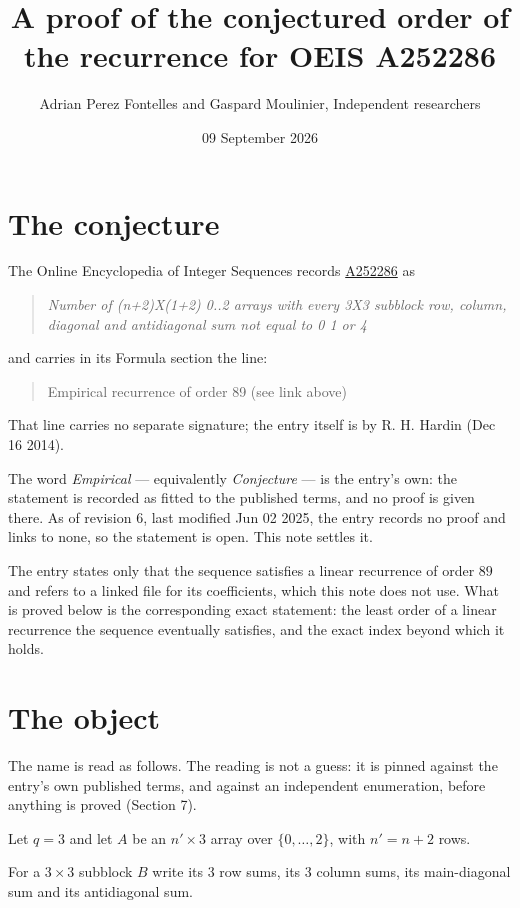 \documentclass[11pt]{article}
\title{A proof of the conjectured order of the recurrence for OEIS A252286}
\author{Adrian Perez Fontelles and Gaspard Moulinier, Independent researchers}
\date{09 September 2026}
\theoremstyle{definition}
\begin{document}
\maketitle
\section{The conjecture}

The Online Encyclopedia of Integer Sequences records \href{https://oeis.org/A252286}{A252286} as

\begin{quote}\itshape Number of (n+2)X(1+2) 0..2 arrays with every 3X3 subblock row, column, diagonal and antidiagonal sum not equal to 0 1 or 4\end{quote}

and carries in its Formula section the line:

\begin{quote}\ttfamily Empirical recurrence of order 89 (see link above)\end{quote}

That line carries no separate signature; the entry itself is by R. H. Hardin (Dec 16 2014).

The word {\itshape Empirical} --- equivalently {\itshape Conjecture} --- is the entry's own: the statement is recorded as fitted to the published terms, and no proof is given there. As of revision 6, last modified Jun 02 2025, the entry records no proof and links to none, so the statement is open. This note settles it.

The entry states only that the sequence satisfies a linear recurrence of order $89$ and refers to a linked file for its coefficients, which this note does not use. What is proved below is the corresponding exact statement: the least order of a linear recurrence the sequence eventually satisfies, and the exact index beyond which it holds.

\section{The object}

The name is read as follows. The reading is not a guess: it is pinned against the entry's own published terms, and against an independent enumeration, before anything is proved (Section 7).

Let $q = 3$ and let $A$ be an $n' \times 3$ array over $\{0,\dots,2\}$, with $n' = n + 2$ rows.

For a $3\times3$ subblock $B$ write its 3 row sums, its 3 column sums, its main-diagonal sum and its antidiagonal sum.
\end{document}
